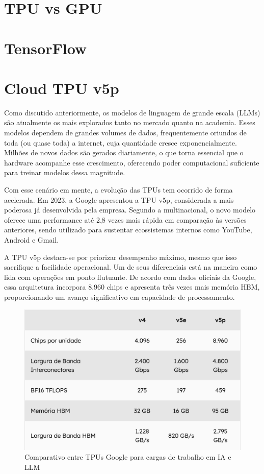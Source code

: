 \documentclass{report}
\begin{document}
\chapter{TPU vs GPU}

\chapter{TensorFlow}

\chapter{Cloud TPU v5p}

Como discutido anteriormente, os modelos de linguagem de grande escala (LLMs) são atualmente os mais explorados tanto no mercado quanto na academia. Esses modelos dependem de grandes volumes de dados, frequentemente oriundos de toda (ou quase toda) a internet, cuja quantidade cresce exponencialmente. Milhões de novos dados são gerados diariamente, o que torna essencial que o hardware acompanhe esse crescimento, oferecendo poder computacional suficiente para treinar modelos dessa magnitude.

Com esse cenário em mente, a evolução das TPUs tem ocorrido de forma acelerada. Em 2023, a Google apresentou a TPU v5p, considerada a mais poderosa já desenvolvida pela empresa. Segundo a multinacional, o novo modelo oferece uma performance até 2,8 vezes mais rápida em comparação às versões anteriores, sendo utilizado para sustentar ecossistemas internos como YouTube, Android e Gmail.

A TPU v5p destaca-se por priorizar desempenho máximo, mesmo que isso sacrifique a facilidade operacional. Um de seus diferenciais está na maneira como lida com operações em ponto flutuante. De acordo com dados oficiais da Google, essa arquitetura incorpora 8.960 chips e apresenta três vezes mais memória HBM, proporcionando um avanço significativo em capacidade de processamento.

\begin{figure}[h]
\includegraphics[scale=0.7]{comparativo-tpus}
\centering
\caption{Comparativo entre TPUs Google para cargas de trabalho em IA e LLM}
\end{figure}
\end{document}

